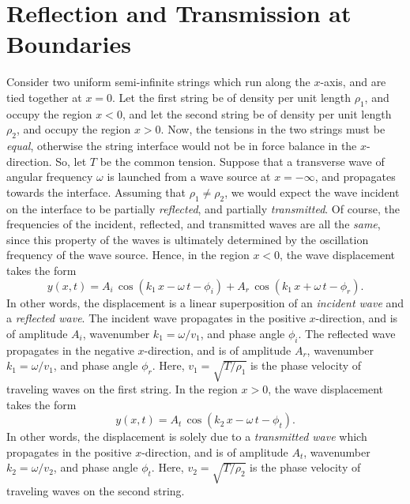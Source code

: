 \section{Reflection and Transmission at Boundaries}\label{srefl}
Consider two uniform semi-infinite strings which run along the $x$-axis, and are tied together at 
$x=0$. Let the first string be of density per unit length $\rho_1$, and occupy the
region $x<0$, and let the second string be of density per unit length $\rho_2$, and
occupy the region $x>0$. Now, the tensions  in the two strings must
be {\em equal}, otherwise the string interface would not be in force balance
in the $x$-direction. So, let $T$ be the common tension. Suppose that a transverse wave of angular frequency $\omega$ is launched
from a wave source at $x=-\infty$, and propagates towards the interface. Assuming that $\rho_1\neq \rho_2$, we would expect the
wave incident on the interface to be partially {\em reflected}, and partially {\em transmitted}. Of course, the
frequencies of the incident, reflected, and transmitted waves are all the {\em same}, since this
property of the waves is ultimately determined by the oscillation frequency of the wave source. 
Hence, in the region $x<0$, the wave displacement takes the form
\begin{equation}
y(x,t)= A_i\,\cos(k_1\,x-\omega\,t-\phi_i) + A_r\,\cos(k_1\,x+\omega\,t-\phi_r).
\end{equation}
 In other words, the displacement is a linear superposition
of an {\em incident wave}\/ and a {\em reflected wave}. The incident wave propagates in the positive $x$-direction, and is of
amplitude $A_i$,  wavenumber $k_1=\omega/v_1$, and 
phase angle $\phi_i$.  The reflected wave  propagates in the negative $x$-direction, and is of
amplitude $A_r$,  wavenumber $k_1=\omega/v_1$, and 
phase angle $\phi_r$.
Here, $v_1=\sqrt{T/\rho_1}$ is the phase velocity of traveling
waves on the first string. 
In the region $x>0$, the wave displacement takes the form
\begin{equation}
y(x,t)= A_t\,\cos(k_2\,x-\omega\,t-\phi_t).
\end{equation}
In other words, the displacement is solely due to a {\em transmitted wave}\/
which propagates in the positive $x$-direction, and is of amplitude $A_t$,
wavenumber $k_2=\omega/v_2$, and phase angle $\phi_t$. Here, $v_2=\sqrt{T/\rho_2}$
is the phase velocity of traveling waves on the second string. 

